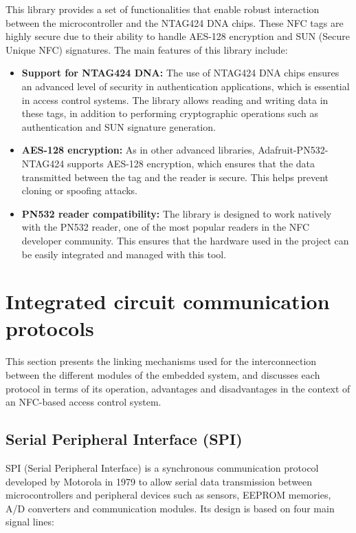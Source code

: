 This library provides a set of functionalities that enable robust interaction between the microcontroller and the NTAG424 DNA chips. These NFC tags are highly secure due to their ability to handle AES-128 encryption and SUN (Secure Unique NFC) signatures. The main features of this library include:

\begin{itemize}
	\item \textbf{Support for NTAG424 DNA:} The use of NTAG424 DNA chips ensures an advanced level of security in authentication applications, which is essential in access control systems. The library allows reading and writing data in these tags, in addition to performing cryptographic operations such as authentication and SUN signature generation.
	
	\item \textbf{AES-128 encryption:} As in other advanced libraries, Adafruit-PN532-NTAG424 supports AES-128 encryption, which ensures that the data transmitted between the tag and the reader is secure. This helps prevent cloning or spoofing attacks.
	
	\item \textbf{PN532 reader compatibility:} The library is designed to work natively with the PN532 reader, one of the most popular readers in the NFC developer community. This ensures that the hardware used in the project can be easily integrated and managed with this tool.
\end{itemize}


\section{Integrated circuit communication protocols}

This section presents the linking mechanisms used for the interconnection between the different modules of the embedded system, and discusses each protocol in terms of its operation, advantages and disadvantages in the context of an NFC-based access control system.

\subsection{Serial Peripheral Interface (SPI)}

SPI (Serial Peripheral Interface) \cite{ref17} is a synchronous communication protocol developed by Motorola in 1979 to allow serial data transmission between microcontrollers and peripheral devices such as sensors, EEPROM memories, A/D converters and communication modules. Its design is based on four main signal lines:

